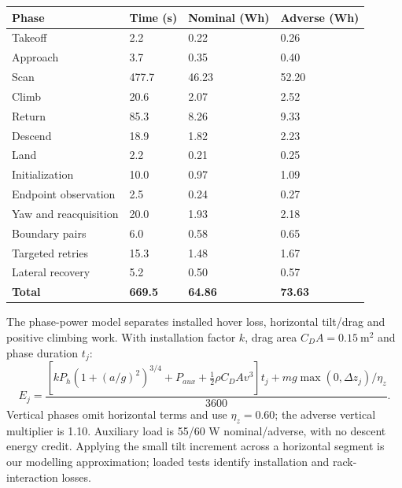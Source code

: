 \documentclass[a4paper,11pt]{article}
\begin{document}
\par\addvspace{8pt}\noindent\begin{minipage}{\linewidth}\centering
{}\label{tab:7}
\begin{tabular}{C{0.260\dimexpr\linewidth-32pt\relax}C{0.250\dimexpr\linewidth-32pt\relax}C{0.250\dimexpr\linewidth-32pt\relax}C{0.240\dimexpr\linewidth-32pt\relax}}
\toprule
\textbf{Phase} & \textbf{Time (s)} & \textbf{Nominal (Wh)} & \textbf{Adverse (Wh)}\\\midrule
Takeoff & 2.2 & 0.22 & 0.26\\
Approach & 3.7 & 0.35 & 0.40\\
Scan & 477.7 & 46.23 & 52.20\\
Climb & 20.6 & 2.07 & 2.52\\
Return & 85.3 & 8.26 & 9.33\\
Descend & 18.9 & 1.82 & 2.23\\
Land & 2.2 & 0.21 & 0.25\\
Initialization & 10.0 & 0.97 & 1.09\\
Endpoint observation & 2.5 & 0.24 & 0.27\\
Yaw and reacquisition & 20.0 & 1.93 & 2.18\\
Boundary pairs & 6.0 & 0.58 & 0.65\\
Targeted retries & 15.3 & 1.48 & 1.67\\
Lateral recovery & 5.2 & 0.50 & 0.57\\
\textbf{Total} & \textbf{669.5} & \textbf{64.86} & \textbf{73.63}\\
\bottomrule\end{tabular}\end{minipage}\par\addvspace{8pt}
The phase-power model separates installed hover loss, horizontal tilt/drag and positive climbing work. With installation factor $k$, drag area $C_D A=0.15~\mathrm{m}^2$ and phase duration $t_j$:
\begin{equation}E_j=\frac{\left[kP_h(1+(a/g)^2)^{3/4}+P_{aux}+\tfrac12\rho C_D A v^3\right]t_j+mg\max(0,\Delta z_j)/\eta_z}{3600}.\end{equation}
Vertical phases omit horizontal terms and use $\eta_z=0.60$; the adverse vertical multiplier is 1.10. Auxiliary load is 55/60 W nominal/adverse, with no descent energy credit. Applying the small tilt increment across a horizontal segment is our modelling approximation; loaded tests identify installation and rack-interaction losses.
\end{document}
